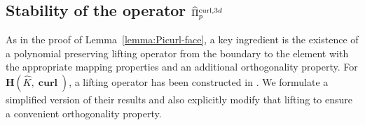 \documentclass{article}
\newcommand{\hatPicurlcom}{\widehat \Pi^{\operatorname*{curl},3d}_p}
\begin{document}
\subsection{Stability of the operator $\protect\hatPicurlcom$}

As in the proof of Lemma~\ref{lemma:Picurl-face}, a key
ingredient is the existence of a polynomial preserving lifting operator from
the boundary to the element with the appropriate
mapping properties and an additional orthogonality property. 
For ${\mathbf{H}}(\widehat{K},\operatorname{\mathbf{curl}})$, 
a lifting operator has been constructed in
\cite{demkowicz-gopalakrishnan-schoeberl-II}. 
We formulate a simplified version
of their results and also explicitly modify that lifting to ensure a convenient orthogonality property.
\end{document}

